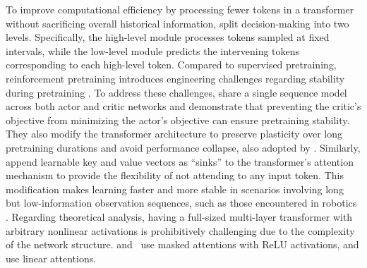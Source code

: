 \documentclass{article}
\begin{document}
To improve computational efficiency by processing fewer tokens in a transformer without sacrificing overall historical information, \citet{huangContextDecisionTransformer2024,huangDecisionMambaReinforcement2024} split decision-making into two levels. Specifically, the high-level module processes tokens sampled at fixed intervals, while the low-level module predicts the intervening tokens corresponding to each high-level token.
Compared to supervised pretraining,
reinforcement pretraining introduces engineering challenges regarding stability during pretraining \citep{grigsbyAMAGOScalableContext2024}.
To address these challenges, \citet{grigsbyAMAGOScalableContext2024} share a single sequence model across both actor and critic networks and demonstrate that preventing the critic's objective from minimizing the actor's objective can ensure pretraining stability.
They also modify
the transformer architecture to preserve plasticity over long pretraining durations and avoid performance collapse, also adopted by \citet{xuMetaReinforcementLearningRobust2024}.
Similarly, \citet{elawadyReLICRecipe64k2024} append learnable key and value vectors as ``sinks'' to the transformer's attention mechanism to provide the flexibility of not attending to any input token. This modification makes learning faster and more stable in scenarios involving long but low-information observation sequences, such as those encountered in robotics \citep{elawadyReLICRecipe64k2024}.
Regarding theoretical analysis, having a full-sized multi-layer transformer with arbitrary nonlinear activations is prohibitively challenging due to the complexity of the network structure.
\citet{linTransformersDecisionMakers2024} and~\citet{shiTransformersGamePlayers2024} use masked attentions with ReLU activations,
and \citet{parkLLMAgentsHave2024,wangTransformersLearnTemporal2024} use linear attentions.
\end{document}
